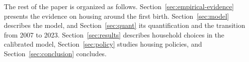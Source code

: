
The rest of the paper is organized as follows.
Section~\ref{sec:empirical-evidence} presents the evidence on housing around
the first birth. Section~\ref{sec:model} describes the model, and
Section~\ref{sec:quant} its quantification and the transition from 2007 to
2023. Section~\ref{sec:results} describes household choices in the calibrated
model, Section~\ref{sec:policy} studies housing policies, and
Section~\ref{sec:conclusion} concludes.
